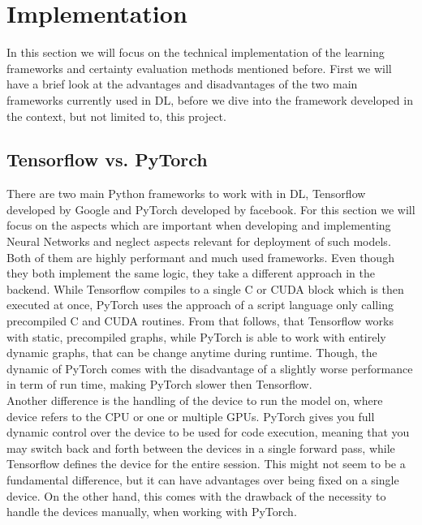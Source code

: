 \documentclass[11pt,a4paper]{article}
\begin{document}
	\section{Implementation}\label{sec:implementation}
	In this section we will focus on the technical implementation of the learning frameworks and certainty evaluation methods mentioned before.
	First we will have a brief look at the advantages and disadvantages of the two main frameworks currently used in DL, before we dive into the framework developed in the context, but not limited to, this project.\\

	\subsection{Tensorflow vs. PyTorch}\label{subsec:tensorflow-vs.-pytorch}
	There are two main Python frameworks to work with in DL, Tensorflow developed by Google and PyTorch developed by facebook.
	For this section we will focus on the aspects which are important when developing and implementing Neural Networks and neglect aspects relevant for deployment of such models.\\

	Both of them are highly performant and much used frameworks.
	Even though they both implement the same logic, they take a different approach in the backend.
	While Tensorflow compiles to a single C or CUDA block which is then executed at once, PyTorch uses the approach of a script language only calling precompiled C and CUDA routines.
	From that follows, that Tensorflow works with static, precompiled graphs, while PyTorch is able to work with entirely dynamic graphs, that can be change anytime during runtime.
	Though, the dynamic of PyTorch comes with the disadvantage of a slightly worse performance in term of run time, making PyTorch slower then Tensorflow.\\

	Another difference is the handling of the device to run the model on, where device refers to the CPU or one or multiple GPUs.
	PyTorch gives you full dynamic control over the device to be used for code execution, meaning that you may switch back and forth between the devices in a single forward pass, while Tensorflow defines the device for the entire session.
	This might not seem to be a fundamental difference, but it can have advantages over being fixed on a single device.
	On the other hand, this comes with the drawback of the necessity to handle the devices manually, when working with PyTorch.\\
\end{document}
